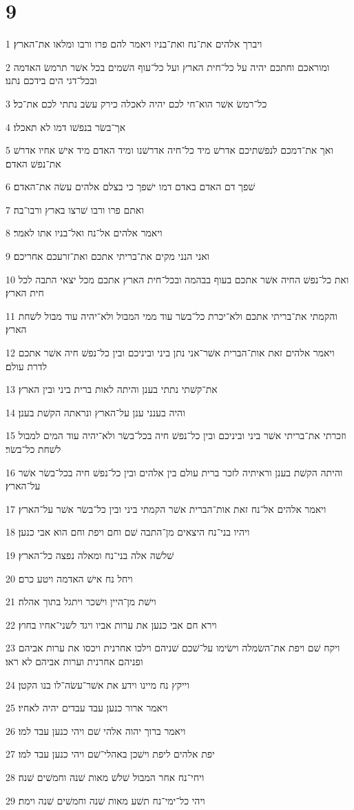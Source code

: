 \chapter{9}

\par 1 ויברך אלהים את־נח ואת־בניו ויאמר להם פרו ורבו ומלאו את־הארץ׃
\par 2 ומוראכם וחתכם יהיה על כל־חית הארץ ועל כל־עוף השׁמים בכל אשׁר תרמשׂ האדמה ובכל־דגי הים בידכם נתנו׃
\par 3 כל־רמשׂ אשׁר הוא־חי לכם יהיה לאכלה כירק עשׂב נתתי לכם את־כל׃
\par 4 אך־בשׂר בנפשׁו דמו לא תאכלו׃
\par 5 ואך את־דמכם לנפשׁתיכם אדרשׁ מיד כל־חיה אדרשׁנו ומיד האדם מיד אישׁ אחיו אדרשׁ את־נפשׁ האדם׃
\par 6 שׁפך דם האדם באדם דמו ישׁפך כי בצלם אלהים עשׂה את־האדם׃
\par 7 ואתם פרו ורבו שׁרצו בארץ ורבו־בה׃
\par 8 ויאמר אלהים אל־נח ואל־בניו אתו לאמר׃
\par 9 ואני הנני מקים את־בריתי אתכם ואת־זרעכם אחריכם׃
\par 10 ואת כל־נפשׁ החיה אשׁר אתכם בעוף בבהמה ובכל־חית הארץ אתכם מכל יצאי התבה לכל חית הארץ׃
\par 11 והקמתי את־בריתי אתכם ולא־יכרת כל־בשׂר עוד ממי המבול ולא־יהיה עוד מבול לשׁחת הארץ׃
\par 12 ויאמר אלהים זאת אות־הברית אשׁר־אני נתן ביני וביניכם ובין כל־נפשׁ חיה אשׁר אתכם לדרת עולם׃
\par 13 את־קשׁתי נתתי בענן והיתה לאות ברית ביני ובין הארץ׃
\par 14 והיה בענני ענן על־הארץ ונראתה הקשׁת בענן׃
\par 15 וזכרתי את־בריתי אשׁר ביני וביניכם ובין כל־נפשׁ חיה בכל־בשׂר ולא־יהיה עוד המים למבול לשׁחת כל־בשׂר׃
\par 16 והיתה הקשׁת בענן וראיתיה לזכר ברית עולם בין אלהים ובין כל־נפשׁ חיה בכל־בשׂר אשׁר על־הארץ׃
\par 17 ויאמר אלהים אל־נח זאת אות־הברית אשׁר הקמתי ביני ובין כל־בשׂר אשׁר על־הארץ׃
\par 18 ויהיו בני־נח היצאים מן־התבה שׁם וחם ויפת וחם הוא אבי כנען׃
\par 19 שׁלשׁה אלה בני־נח ומאלה נפצה כל־הארץ׃
\par 20 ויחל נח אישׁ האדמה ויטע כרם׃
\par 21 וישׁת מן־היין וישׁכר ויתגל בתוך אהלה׃
\par 22 וירא חם אבי כנען את ערות אביו ויגד לשׁני־אחיו בחוץ׃
\par 23 ויקח שׁם ויפת את־השׂמלה וישׂימו על־שׁכם שׁניהם וילכו אחרנית ויכסו את ערות אביהם ופניהם אחרנית וערות אביהם לא ראו׃
\par 24 וייקץ נח מיינו וידע את אשׁר־עשׂה־לו בנו הקטן׃
\par 25 ויאמר ארור כנען עבד עבדים יהיה לאחיו׃
\par 26 ויאמר ברוך יהוה אלהי שׁם ויהי כנען עבד למו׃
\par 27 יפת אלהים ליפת וישׁכן באהלי־שׁם ויהי כנען עבד למו׃
\par 28 ויחי־נח אחר המבול שׁלשׁ מאות שׁנה וחמשׁים שׁנה׃
\par 29 ויהי כל־ימי־נח תשׁע מאות שׁנה וחמשׁים שׁנה וימת׃

